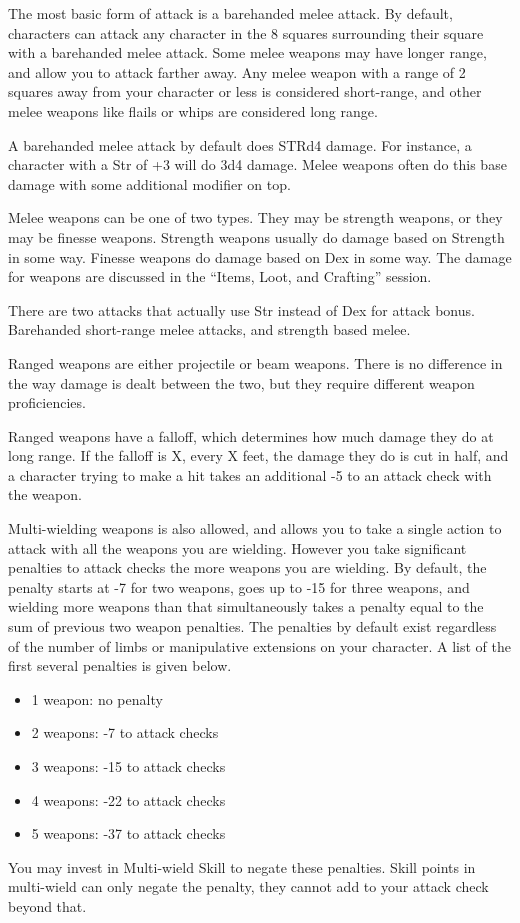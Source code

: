 The most basic form of attack is a barehanded melee attack. By default, characters can attack any character in the 8 squares surrounding their square with a barehanded melee attack. Some melee weapons may have longer range, and allow you to attack farther away. Any melee weapon with a range of 2 squares away from your character or less is considered short-range, and other melee weapons like flails or whips are considered long range.

A barehanded melee attack by default does STRd4 damage. For instance, a character with a Str of +3 will do 3d4 damage. Melee weapons often do this base damage with some additional modifier on top.

Melee weapons can be one of two types. They may be strength weapons, or they may be finesse weapons. Strength weapons usually do damage based on Strength in some way. Finesse weapons do damage based on Dex in some way. The damage for weapons are discussed in the “Items, Loot, and Crafting” session.

There are two attacks that actually use Str instead of Dex for attack bonus. Barehanded short-range melee attacks, and strength based melee.

Ranged weapons are either projectile or beam weapons. There is no difference in the way damage is dealt between the two, but they require different weapon proficiencies.

Ranged weapons have a falloff, which determines how much damage they do at long range. If the falloff is X, every X feet, the damage they do is cut in half, and a character trying to make a hit takes an additional -5 to an attack check with the weapon.

Multi-wielding weapons is also allowed, and allows you to take a single action to attack with all the weapons you are wielding. However you take significant penalties to attack checks the more weapons you are wielding. By default, the penalty starts at -7 for two weapons, goes up to -15 for three weapons, and wielding more weapons than that simultaneously takes a penalty equal to the sum of previous two weapon penalties. The penalties by default exist regardless of the number of limbs or manipulative extensions on your character. A list of the first several penalties is given below.
\begin{itemize}
\item 1 weapon: no penalty
\item 2 weapons: -7 to attack checks 
\item 3 weapons: -15 to attack checks 
\item 4 weapons: -22 to attack checks 
\item 5 weapons: -37 to attack checks
\end{itemize}
You may invest in Multi-wield Skill to negate these penalties. Skill points in multi-wield can only negate the penalty, they cannot add to your attack check beyond that.

